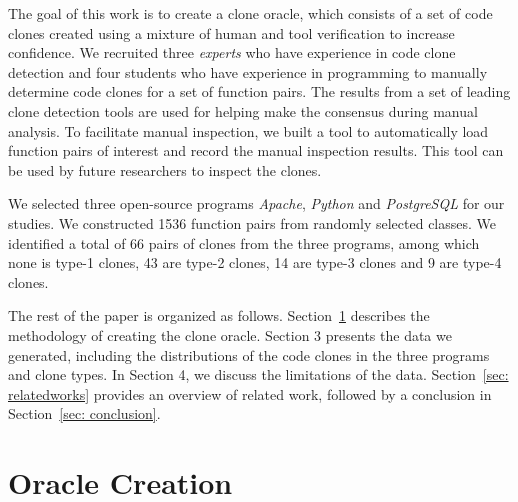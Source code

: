 \documentclass{sig-alternate}
\begin{document}

The goal of this work is to create a clone oracle, which consists of a set of code clones created using a mixture of human and tool verification to increase confidence. We recruited three {\it experts} who have experience in code clone detection and four students who have experience in programming to manually determine code clones for a set of function pairs. The results from a set of leading clone detection tools are used for helping make the consensus during manual analysis. To facilitate manual inspection, we built a tool to automatically load function pairs of interest and record the manual inspection results. This tool can be used by future researchers to inspect the clones.

We selected three open-source programs {\it Apache}, {\it Python} and {\it PostgreSQL} for our studies. We constructed 1536 function pairs from randomly selected classes. We identified a total of 66 pairs of clones from the three programs, among which none is type-1 clones, 43 are type-2 clones, 14 are type-3 clones and 9 are type-4 clones.

The rest of the paper is organized as follows. Section~\ref{sec: oraclecreation} describes the methodology of creating the clone oracle. Section 3 presents the data we generated, including the distributions of the code clones in the three programs and clone types. In Section 4, we discuss the limitations of the data. Section~\ref{sec: relatedworks} provides an overview of related work, followed by a conclusion in Section~\ref{sec: conclusion}.


\section{Oracle Creation} %
\label{sec: oraclecreation}
\end{document}
